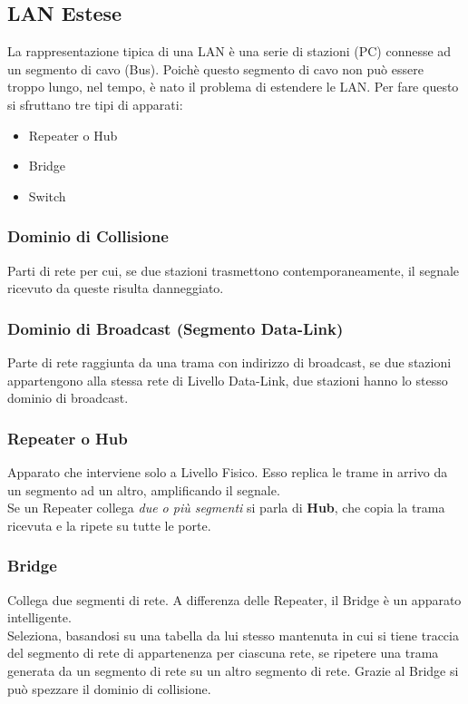 \documentclass{article}
\begin{document}
        \subsection{LAN Estese}
            La rappresentazione tipica di una LAN è una serie di stazioni (PC) connesse ad un segmento di cavo (Bus). Poichè questo segmento di cavo non può essere troppo lungo, nel tempo, è nato il problema di estendere le LAN. Per fare questo si sfruttano tre tipi di apparati:
            \begin{itemize}
                \item Repeater o Hub
                \item Bridge
                \item Switch
            \end{itemize} 

            \subsubsection{Dominio di Collisione}
                Parti di rete per cui, se due stazioni trasmettono contemporaneamente, il segnale ricevuto da queste risulta danneggiato.
            
            \subsubsection{Dominio di Broadcast (Segmento Data-Link)}
                Parte di rete raggiunta da una trama con indirizzo di broadcast, se due stazioni appartengono alla stessa rete di Livello Data-Link, due stazioni hanno lo stesso dominio di broadcast.

            \subsubsection{Repeater o Hub}
                Apparato che interviene solo a Livello Fisico. Esso replica le trame in arrivo da un segmento ad un altro, amplificando il segnale. \\
                Se un Repeater collega \textit{due o più segmenti} si parla di \textbf{Hub}, che copia la trama ricevuta e la ripete su tutte le porte.

            \subsubsection{Bridge}
                Collega due segmenti di rete. A differenza delle Repeater, il Bridge è un apparato intelligente. \\
                Seleziona, basandosi su una tabella da lui stesso mantenuta in cui si tiene traccia del segmento di rete di appartenenza per ciascuna rete, se ripetere una trama generata da un segmento di rete su un altro segmento di rete. Grazie al Bridge si può spezzare il dominio di collisione.
\end{document}
